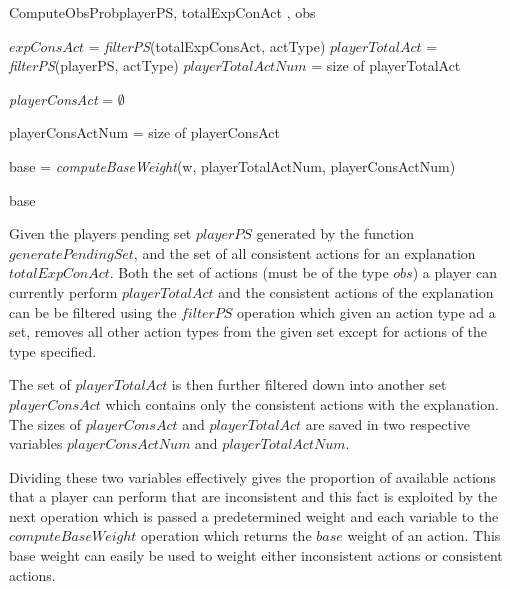 \documentclass[parskip]{cs4rep}
\begin{document}
\begin{pseudocode}[ruled]{ComputeObsProb}{playerPS, totalExpConAct , obs}
\begin{algorithm}[H]
$expConsAct$ = \textit{filterPS}(totalExpConsAct, actType) \newline
$playerTotalAct$ = \textit{filterPS}(playerPS, actType)\newline
$playerTotalActNum$ = size of playerTotalAct \newline

\textit{playerConsAct} = $\emptyset$ \newline


playerConsActNum = size of playerConsAct\newline

base = \textit{computeBaseWeight}(w, playerTotalActNum, playerConsActNum)\newline 

\Return base

\end{algorithm}
\end{pseudocode}

Given the players pending set $playerPS$ generated by the function $generatePendingSet$, and the set of all consistent actions for an explanation $totalExpConAct$. Both the set of actions (must be of the type $obs$) a player can currently perform $playerTotalAct$ and the consistent actions of the explanation can be be filtered using the $filterPS$ operation which given an action type ad a set, removes all other action types from the given set except for actions of the type specified. 

The set of $playerTotalAct$ is then further filtered down into another set $playerConsAct$ which contains only the consistent actions with the explanation. The sizes of $playerConsAct$ and $playerTotalAct$ are saved in two respective variables $playerConsActNum$ and $playerTotalActNum$.

Dividing these two variables effectively gives the proportion of available actions that a player can perform that are inconsistent and this fact is exploited by the next operation which is passed a predetermined weight and each variable to the $computeBaseWeight$ operation which returns the $base$ weight of an action. This base weight can easily be used to weight either inconsistent actions or consistent actions.
\end{document}
